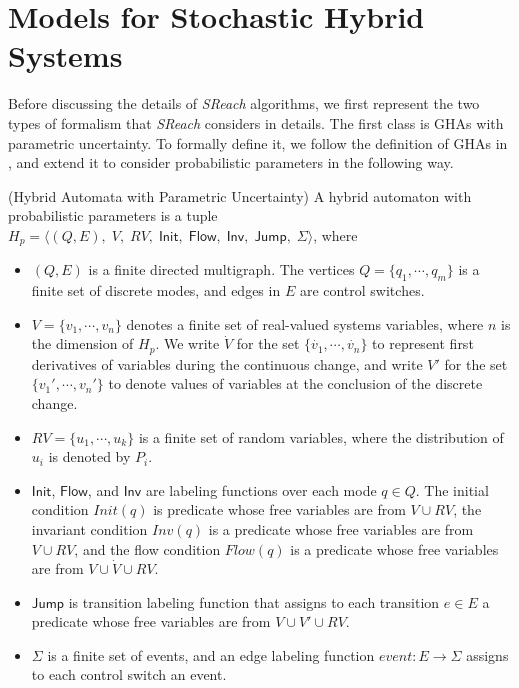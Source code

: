 \section{Models for Stochastic Hybrid Systems}
Before discussing the details of {\it SReach} algorithms, we first represent the two types of formalism that {\it SReach} considers in details. The first class is GHAs with parametric uncertainty. To formally define it, we follow the definition of GHAs in \cite{henzinger2000theory}, and extend it to consider probabilistic parameters in the following way.
\vspace{-.4cm}
\begin{definition}
\label{def:ha_para}
{\rm(Hybrid Automata with Parametric Uncertainty)} A hybrid automaton with probabilistic parameters is a tuple $H_p = \langle (Q, E), \;V, \;RV, \; \mathsf{Init},\; \mathsf{Flow}, \; \mathsf{Inv}, \; \mathsf{Jump}, \; \Sigma \rangle$, where
\vspace{-.4cm}
\begin{itemize}
\item $(Q, E)$ is a finite directed multigraph. The vertices $Q=\{q_1, \cdots,q_m\}$ is a finite set of discrete modes, and edges in $E$ are control switches.
\vspace{-.2cm}
\item $V = \{ v_1, \cdots, v_n \}$ denotes a finite set of real-valued systems variables, where $n$ is the dimension of $H_p$. We write $\dot{V}$ for the set $\{\dot{v_1}, \cdots, \dot{v_n}\}$ to represent first derivatives of variables during the continuous change, and write $V'$ for the set $\{v_1', \cdots, v_n'\}$ to denote values of variables at the conclusion of the discrete change.
\vspace{-.2cm}
\item $RV = \{ u_1, \cdots, u_k \}$ is a finite set of random variables, where the distribution of $u_i$ is denoted by $P_i$.
\vspace{-.2cm}
\item $\mathsf{Init}$, $\mathsf{Flow}$, and $\mathsf{Inv}$ are labeling functions over each mode $q \in Q$. The initial condition $Init(q)$ is predicate whose free variables are from $V \cup RV$, the invariant condition $Inv(q)$ is a predicate whose free variables are from $V \cup RV$, and the flow condition $Flow(q)$ is a predicate whose free variables are from $V \cup \dot{V} \cup RV$.
\vspace{-.2cm}
\item $\mathsf{Jump}$ is transition labeling function that assigns to each transition $e \in E$ a predicate whose free variables are from $V \cup V' \cup RV$.
\vspace{-.2cm}
\item $\Sigma$ is a finite set of events, and an edge labeling function $event: E \to \Sigma$ assigns to each control switch an event. 
\end{itemize}
\end{definition}

